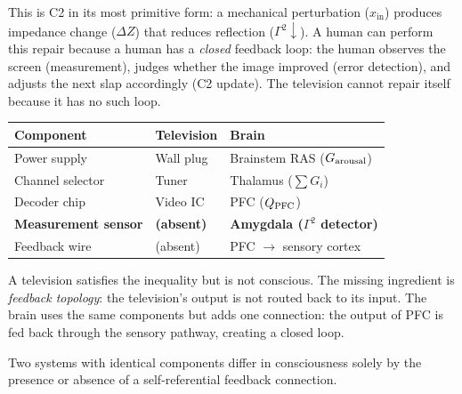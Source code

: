 \documentclass[aps,pre,twocolumn,superscriptaddress,floatfix]{revtex4-2}
\begin{document}
This is C2 in its most primitive form:
a mechanical perturbation ($x_{\text{in}}$) produces
impedance change ($\Delta Z$) that reduces reflection
($\Gamma^2 \downarrow$).
A human can perform this repair because a human has
a \emph{closed} feedback loop: the human observes the
screen (measurement), judges whether the image improved
(error detection), and adjusts the next slap accordingly
(C2 update).  The television cannot repair itself
because it has no such loop.

\begin{center}
\begin{tabular}{@{}lll@{}}
\toprule
Component & Television & Brain \\
\midrule
Power supply & Wall plug & Brainstem RAS ($G_{\text{arousal}}$) \\
Channel selector & Tuner & Thalamus ($\sum G_i$) \\
Decoder chip & Video IC & PFC ($Q_{\text{PFC}}$) \\
\textbf{Measurement sensor} & \textbf{(absent)} &
  \textbf{Amygdala ($\Gamma^2$ detector)} \\
Feedback wire & (absent) & PFC $\to$ sensory cortex \\
\bottomrule
\end{tabular}
\end{center}

A television satisfies the inequality but is not conscious.
The missing ingredient is \emph{feedback topology}: the
television's output is not routed back to its input.
The brain uses the same components but adds one connection:
the output of PFC is fed back through the sensory pathway,
creating a closed loop.

\begin{corollary}
Two systems with identical components differ in consciousness
solely by the presence or absence of a self-referential
feedback connection.
\end{corollary}
\end{document}
